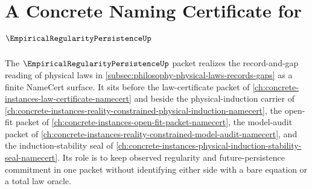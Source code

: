 \chapter{A Concrete Naming Certificate for $\EmpiricalRegularityPersistenceUp$}
\label{ch:concrete-instances-empirical-regularity-persistence-namecert}

The $\EmpiricalRegularityPersistenceUp$ packet realizes the record-and-gap reading of physical laws in \autoref{subsec:philosophy-physical-laws-records-gaps} as a finite NameCert surface. It sits before the law-certificate packet of \autoref{ch:concrete-instances-law-certificate-namecert} and beside the physical-induction carrier of \autoref{ch:concrete-instances-reality-constrained-physical-induction-namecert}, the open-fit packet of \autoref{ch:concrete-instances-open-fit-packet-namecert}, the model-audit packet of \autoref{ch:concrete-instances-reality-constrained-model-audit-namecert}, and the induction-stability seal of \autoref{ch:concrete-instances-physical-induction-stability-seal-namecert}. Its role is to keep observed regularity and future-persistence commitment in one packet without identifying either side with a bare equation or a total law oracle.

